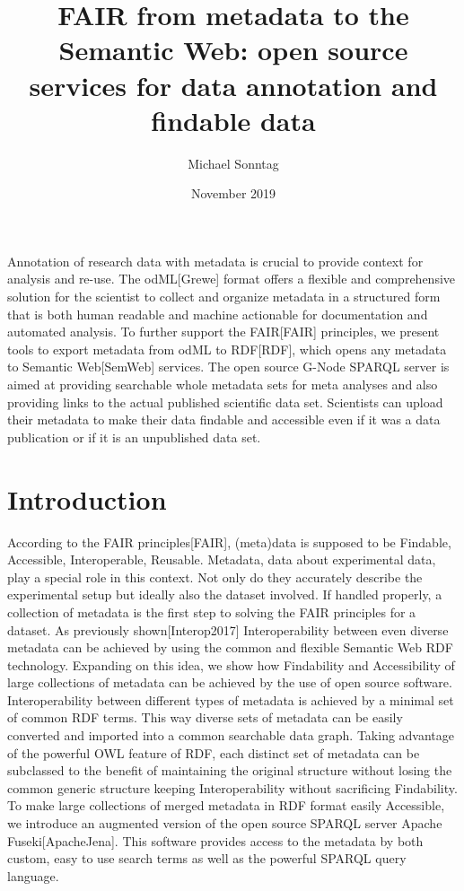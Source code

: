 \documentclass{article}
\title{FAIR from metadata to the Semantic Web: open source services for data annotation and findable data}
\author{Michael Sonntag}
\date{November 2019}
\begin{document}
\maketitle

\begin{Abstract}
Annotation of research data with metadata is crucial to provide context for analysis and
re-use. The odML[Grewe] format offers a flexible and comprehensive solution for the
scientist to collect and organize metadata in a structured form that is both human readable
and machine actionable for documentation and automated analysis. To further support the
FAIR[FAIR] principles, we present tools to export metadata from odML to RDF[RDF], which
opens any metadata to Semantic Web[SemWeb] services. The open source G-Node SPARQL server
is aimed at providing searchable whole metadata sets for meta analyses and also providing
links to the actual published scientific data set. Scientists can upload their metadata
to make their data findable and accessible even if it was a data publication or if it is
an unpublished data set.
\end{Abstract}

\section{Introduction}
According to the FAIR principles[FAIR], (meta)data is supposed to be Findable, Accessible,
Interoperable, Reusable. Metadata, data about experimental data, play a special role in
this context. Not only do they accurately describe the experimental setup but ideally also
the dataset involved. If handled properly, a collection of metadata is the first step to
solving the FAIR principles for a dataset. As previously shown[Interop2017] Interoperability
between even diverse metadata can be achieved by using the common and flexible
Semantic Web RDF technology.
Expanding on this idea, we show how Findability and Accessibility of large collections of
metadata can be achieved by the use of open source software. Interoperability between
different types of metadata is achieved by a minimal set of common RDF terms.
This way diverse sets of metadata can be easily converted and imported into a common
searchable data graph. Taking advantage of the powerful OWL feature of RDF, each distinct
set of metadata can be subclassed to the benefit of maintaining the original structure
without losing the common generic structure keeping Interoperability without sacrificing
Findability.
To make large collections of merged metadata in RDF format easily Accessible, we introduce
an augmented version of the open source SPARQL server Apache Fuseki[ApacheJena]. This
software provides access to the metadata by both custom, easy to use search terms as well
as the powerful SPARQL query language.
\end{document}
